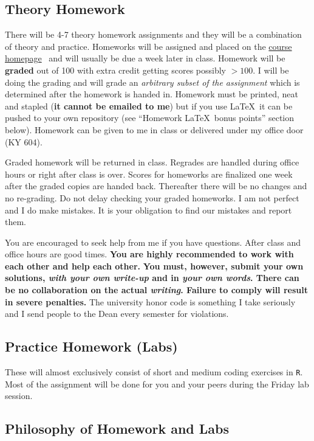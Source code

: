 \documentclass[12pt]{article}
\newcommand{\ingreen}[1]{\color{green}\textbf{#1} \color{black}}
\newcommand{\inred}[1]{\color{red}\textbf{#1} \color{black}}
\newcommand{\coursewebpage}{\href{https://github.com/kapelner/QC_Math_390.4_Spring_2020}{course homepage}}
\newcommand{\qu}[1]{``#1''}
\begin{document}
\subsection*{Theory Homework}

There will be 4-7 theory homework assignments and they will be a combination of theory and practice. Homeworks will be assigned and placed on the \coursewebpage~ and will usually be due a week later in class. Homework will be \textbf{graded} out of 100 with extra credit getting scores possibly $> 100$. I will be doing the grading and will grade an \textit{arbitrary subset of the assignment} which is determined after the homework is handed in. Homework must be printed, neat and stapled (\textbf{it cannot be emailed to me}) but if you use \LaTeX~it can be pushed to your own repository (see \qu{Homework \LaTeX~bonus points} section below). Homework can be given to me in class or delivered under my office door (KY 604).

Graded homework will be returned in class. Regrades are handled during office hours or right after class is over. Scores for homeworks are finalized one week after the graded copies are handed back. Thereafter there will be no changes and no re-grading. Do not delay checking your graded homeworks. I am not perfect and I do make mistakes. It is your obligation to find our mistakes and report them.

You are encouraged to seek help from me if you have questions. After class and office hours are good times. \ingreen{You are highly recommended to work with each other and help each other.} \inred{You must, however, submit your own solutions, \textit{with your own write-up} and in \textit{your own words}. There can be no collaboration on the actual \textit{writing}. Failure to comply will result in severe penalties.} The university honor code is something I take seriously and I send people to the Dean every semester for violations.

\subsection*{Practice Homework (Labs)}

These will almost exclusively consist of short and medium coding exercises in \texttt{R}. Most of the assignment will be done for you and your peers during the Friday lab session.


\subsection*{Philosophy of Homework and Labs}
\end{document}
